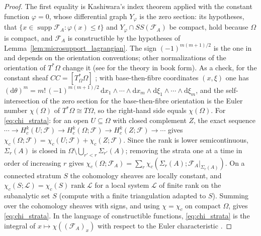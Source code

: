 \documentclass[11pt,a4paper,reqno]{amsart}
\theoremstyle{definition}
\theoremstyle{remark}
\numberwithin{equation}{section}
\newcommand{\dif}{\mathrm{d}}
\begin{document}
\begin{proof}
The first equality is Kashiwara's index theorem \cite[Thm.~4.2]{Kashiwara1985} applied with the constant function $\varphi = 0$, whose differential graph $Y_\varphi$ is the zero section: its hypotheses, that $\{x \in \operatorname{supp}\mathcal{F}_A : \varphi(x) \le t\}$ and $Y_\varphi \cap SS(\mathcal{F}_A)$ be compact, hold because $\Omega$ is compact, and $\mathcal{F}_A$ is constructible by the hypotheses of Lemma~\ref{lem:microsupport_lagrangian}. The sign $(-1)^{m(m+1)/2}$ is the one in \cite[Thm.~4.2]{Kashiwara1985} and depends on the orientation conventions; other normalizations of the orientation of $T^*\Omega$ change it (see \cite[Ch.~IX]{KashiwaraSchapira1990} for the theory in book form). As a check, for the constant sheaf $CC = [T^*_\Omega\Omega]$ \cite[Ex.~8.5(i)]{Kashiwara1985}; with base-then-fibre coordinates $(x,\xi)$ one has $(\dif\theta)^m = m!\,(-1)^{m(m+1)/2}\,\dif x_1\wedge\cdots\wedge\dif x_m\wedge\dif\xi_1\wedge\cdots\wedge\dif\xi_m$, and the self-intersection of the zero section for the base-then-fibre orientation is the Euler number $\chi(\Omega)$ of $T^*\Omega \cong T\Omega$, so the right-hand side equals $\chi(\Omega)$. For \eqref{eq:chi_strata}: for an open $U \subseteq \Omega$ with closed complement $Z$, the exact sequence $\cdots \to H^k_c(U; \mathcal{F}) \to H^k_c(\Omega; \mathcal{F}) \to H^k_c(Z; \mathcal{F}) \to \cdots$ gives $\chi_c(\Omega;\mathcal{F}) = \chi_c(U;\mathcal{F}) + \chi_c(Z;\mathcal{F})$. Since the rank is lower semicontinuous, $\Sigma_r(A)$ is closed in $\Omega \setminus \bigcup_{r' < r} \Sigma_{r'}(A)$; removing the strata one at a time in order of increasing $r$ gives $\chi_c(\Omega;\mathcal{F}_A) = \sum_r \chi_c(\Sigma_r(A); \mathcal{F}_A|_{\Sigma_r(A)})$. On a connected stratum $S$ the cohomology sheaves are locally constant, and $\chi_c(S; \mathcal{L}) = \chi_c(S)\operatorname{rank}\mathcal{L}$ for a local system $\mathcal{L}$ of finite rank on the subanalytic set $S$ (compute with a finite triangulation adapted to $S$). Summing over the cohomology sheaves with signs, and using $\chi = \chi_c$ on compact $\Omega$, gives \eqref{eq:chi_strata}. In the language of constructible functions, \eqref{eq:chi_strata} is the integral of $x \mapsto \chi((\mathcal{F}_A)_x)$ with respect to the Euler characteristic \cite{Viro1988,Schapira1991}.
\end{proof}
\end{document}
